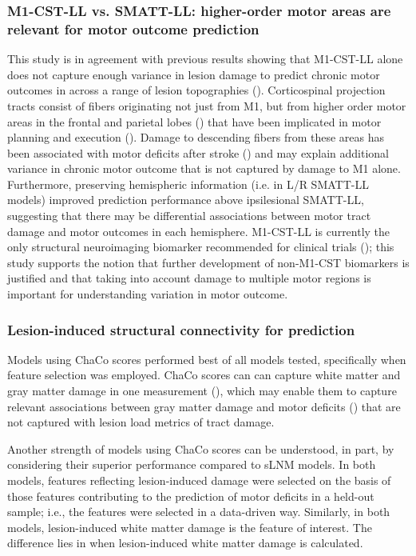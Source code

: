 \documentclass[10pt]{article}
\begin{document}
\subsubsection*{M1-CST-LL vs. SMATT-LL: higher-order motor areas are relevant for motor outcome prediction}
This study is in agreement with previous results showing that M1-CST-LL alone does not capture enough variance in lesion damage to predict chronic motor outcomes in across a range of lesion topographies (\cite{Rondina2017-ij, Park2016-te, Ito2022-em}). Corticospinal projection tracts consist of fibers originating not just from M1, but from higher order motor areas in the frontal and parietal lobes (\cite{Galea1994-yi}) that have been implicated in motor planning and execution (\cite{Ball1999-yo}). Damage to descending fibers from these areas has been associated with motor deficits after stroke (\cite{Ito2022-em, Riley2011-xo}) and may explain additional variance in chronic motor outcome that is not captured by damage to M1 alone. Furthermore, preserving hemispheric information (i.e. in L/R SMATT-LL models) improved prediction performance above ipsilesional SMATT-LL, suggesting that there may be differential associations between motor tract damage and motor outcomes in each hemisphere. M1-CST-LL is currently the only structural neuroimaging biomarker recommended for clinical trials (\cite{Boyd2017-gs}); this study supports the notion that further development of non-M1-CST biomarkers is justified and that taking into account damage to multiple motor regions is important for understanding variation in motor outcome.

\subsubsection*{Lesion-induced structural connectivity for prediction}

Models using ChaCo scores performed best of all models tested, specifically when feature selection was employed. ChaCo scores can can capture white matter and gray matter damage in one measurement (\cite{Kuceyeski2013-nk}), which may enable them to capture relevant associations between gray matter damage and motor deficits (\cite{Park2016-te,Rondina2016-ds}) that are not captured with lesion load metrics of tract damage. 

Another strength of models using ChaCo scores can be understood, in part, by considering their superior performance compared to sLNM models. In both models, features reflecting lesion-induced damage were selected on the basis of those features contributing to the prediction of motor deficits in a held-out sample; i.e., the features were selected in a data-driven way. Similarly, in both models, lesion-induced white matter damage is the feature of interest.
The difference lies in when lesion-induced white matter damage is calculated. 
\end{document}
